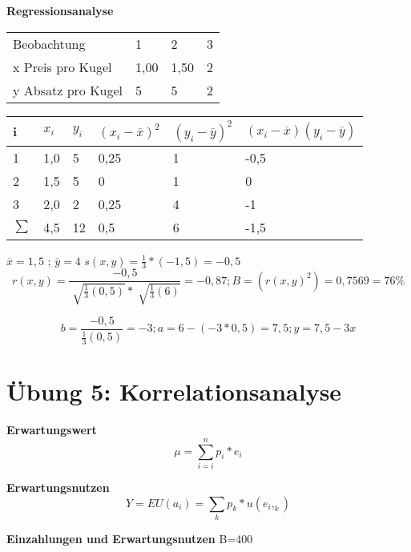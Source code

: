 \documentclass[11pt,twocolumn,fleqn]{article}
\begin{document}
\textbf{Regressionsanalyse}
\begin{center}
    \begin{tabular}{ l | l | l | l }
Beobachtung        & 1    & 2    & 3\\
x Preis pro Kugel  & 1,00 & 1,50 & 2\\ \hline
y Absatz pro Kugel & 5    & 5    & 2
    \end{tabular}
\end{center}

\begin{center}
    \begin{tabular}{ l | l | l | l | l | l }
i & $x_i$ & $y_i$ & $ (x_i - \overline{x})^2 $ & $(y_i - \overline{y})^2$ & $(x_i - \overline{x})(y_i - \overline{y})$ \\ \hline
1       & 1,0 & 5  & 0,25 & 1  & -0,5 \\ 
2       & 1,5 & 5  & 0    & 1  & 0    \\
3       & 2,0 & 2  & 0,25 & 4  & -1   \\ \hline
$\sum$  & 4,5 & 12 & 0,5  & 6  & -1,5 
    \end{tabular}
\end{center}
$ \overline{x}=1,5$ ; $\overline{y}=4$ \newline
$ s(x,y) = \frac{1}{3}*(-1,5) = -0,5 $ \newline
\begin{equation*}
  r(x,y) = \frac{-0,5}{ \sqrt[]{\frac{1}{3}(0,5) } * \sqrt[]{ \frac{1}{3}(6) } } = -0,87; B=(r(x,y)^2) = 0,7569 = 76\% 
\end{equation*}

\begin{equation*}
b = \frac{-0,5}{ \frac{1}{3}(0,5) } = -3; a = 6 - (-3 * 0,5) = 7,5; y = 7,5 - 3x 
\end{equation*}



\section{Übung 5: Korrelationsanalyse}
\textbf{Erwartungswert}
\begin{equation*}
\mu = \sum^n_{i=i}p_i*e_i
\end{equation*}

\textbf{Erwartungsnutzen}
\begin{equation*}
Y=EU(a_i)=\sum_kp_k*u(e_i,_k)
\end{equation*}


\textbf{Einzahlungen und Erwartungsnutzen}
B=400
\end{document}
